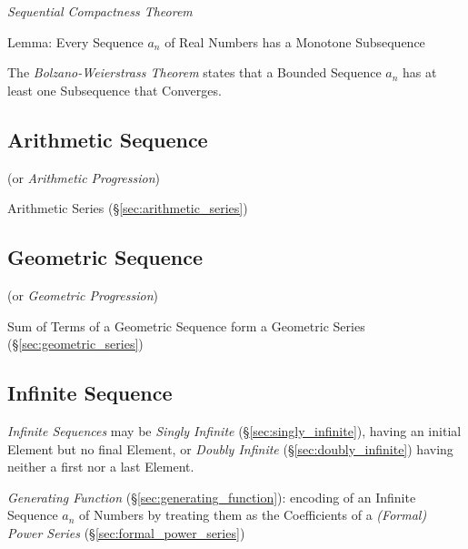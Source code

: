 \emph{Sequential Compactness Theorem}

Lemma: Every Sequence $a_n$ of Real Numbers has a Monotone
Subsequence

The \emph{Bolzano-Weierstrass Theorem} states that a Bounded Sequence
$a_n$ has at least one Subsequence that Converges.



\subsection{Arithmetic Sequence}\label{sec:arithmetic_sequence}

(or \emph{Arithmetic Progression})

Arithmetic Series (\S\ref{sec:arithmetic_series})



\subsection{Geometric Sequence}\label{sec:geometric_sequence}

(or \emph{Geometric Progression})

Sum of Terms of a Geometric Sequence form a Geometric Series
(\S\ref{sec:geometric_series})



\subsection{Infinite Sequence}\label{sec:infinite_sequence}

\emph{Infinite Sequences} may be \emph{Singly Infinite}
(\S\ref{sec:singly_infinite}), having an initial Element but no final
Element, or \emph{Doubly Infinite} (\S\ref{sec:doubly_infinite})
having neither a first nor a last Element.

\fist \emph{Generating Function} (\S\ref{sec:generating_function}): encoding of
an Infinite Sequence $a_n$ of Numbers by treating them as the Coefficients of a
\emph{(Formal) Power Series} (\S\ref{sec:formal_power_series})



